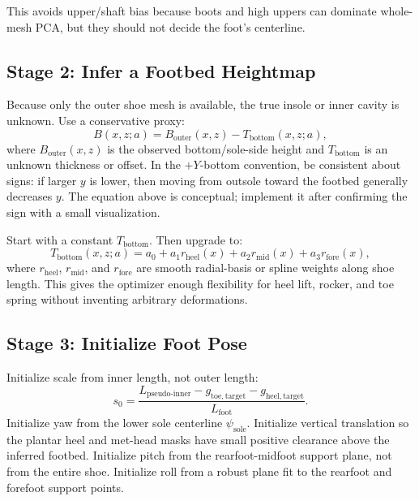\documentclass[11pt]{article}
\begin{document}
This avoids upper/shaft bias because boots and high uppers can dominate whole-mesh PCA, but they should not decide the foot's centerline.

\subsection{Stage 2: Infer a Footbed Heightmap}

Because only the outer shoe mesh is available, the true insole or inner cavity is unknown. Use a conservative proxy:
\begin{equation}
B(x,z;a)=B_{\mathrm{outer}}(x,z)-T_{\mathrm{bottom}}(x,z;a),
\end{equation}
where $B_{\mathrm{outer}}(x,z)$ is the observed bottom/sole-side height and $T_{\mathrm{bottom}}$ is an unknown thickness or offset. In the $+Y$-bottom convention, be consistent about signs: if larger $y$ is lower, then moving from outsole toward the footbed generally decreases $y$. The equation above is conceptual; implement it after confirming the sign with a small visualization.

Start with a constant $T_{\mathrm{bottom}}$. Then upgrade to:
\begin{equation}
T_{\mathrm{bottom}}(x,z;a)=
a_0+a_1r_{\mathrm{heel}}(x)+a_2r_{\mathrm{mid}}(x)+a_3r_{\mathrm{fore}}(x),
\end{equation}
where $r_{\mathrm{heel}}$, $r_{\mathrm{mid}}$, and $r_{\mathrm{fore}}$ are smooth radial-basis or spline weights along shoe length. This gives the optimizer enough flexibility for heel lift, rocker, and toe spring without inventing arbitrary deformations.

\subsection{Stage 3: Initialize Foot Pose}

Initialize scale from inner length, not outer length:
\begin{equation}
s_0 =
\frac{
L_{\mathrm{pseudo\mbox{-}inner}}
- g_{\mathrm{toe,target}}
- g_{\mathrm{heel,target}}
}{
L_{\mathrm{foot}}
}.
\end{equation}
Initialize yaw from the lower sole centerline $\psi_{\mathrm{sole}}$. Initialize vertical translation so the plantar heel and met-head masks have small positive clearance above the inferred footbed. Initialize pitch from the rearfoot-midfoot support plane, not from the entire shoe. Initialize roll from a robust plane fit to the rearfoot and forefoot support points.
\end{document}
